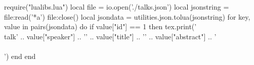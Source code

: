 \documentclass[a3paper]{article}
\begin{document}

\begin{luacode}
require("lualibs.lua")
local file = io.open('./talks.json')
local jsonstring = file:read('*a')
file:close()
local jsondata =  utilities.json.tolua(jsonstring)
for key, value in pairs(jsondata) do
  if value["id"] == 1 then 
      tex.print('\\talk{' .. 
        value["speaker"]  .. 
        '}{'              .. 
        value["title"]    .. 
        '}{'              .. 
        value["abstract"] .. 
        '}\\\\[1em]')
  end
end
\end{luacode}
 
\end{document}
